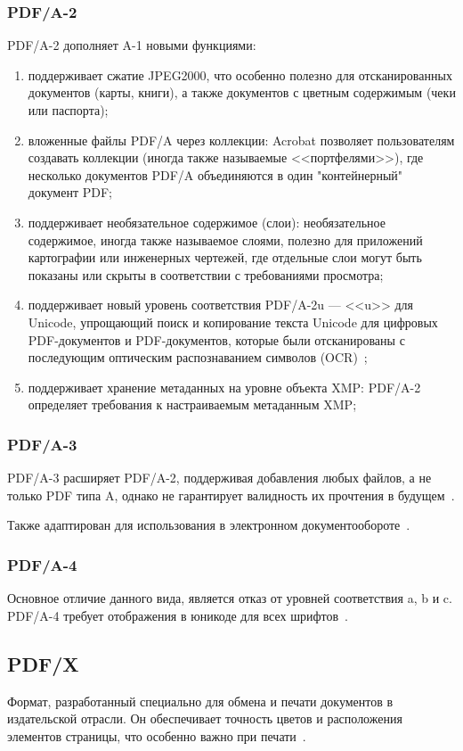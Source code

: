 \subsubsection{PDF/A-2}
PDF/A-2 дополняет A-1 новыми функциями:
\begin{enumerate}
	\item поддерживает сжатие JPEG2000, что особенно полезно для отсканированных документов (карты, книги), а также документов с цветным содержимым (чеки или паспорта);
	\item вложенные файлы PDF/A через коллекции: Acrobat позволяет пользователям создавать коллекции (иногда также называемые <<портфелями>>), где несколько документов PDF/A объединяются в один "контейнерный" документ PDF;
	
	\item поддерживает необязательное содержимое (слои): необязательное содержимое, иногда также называемое слоями, полезно для приложений картографии или инженерных чертежей, где отдельные слои могут быть показаны или скрыты в соответствии с требованиями просмотра;
	\item поддерживает новый уровень соответствия PDF/A-2u --- <<u>> для Unicode, упрощающий поиск и копирование текста Unicode для цифровых PDF-документов и PDF-документов, которые были отсканированы с последующим оптическим распознаванием символов (OCR)~\cite{pdf_a_2};
	
	\item поддерживает хранение метаданных на уровне объекта XMP: PDF/A-2 определяет требования к настраиваемым метаданным XMP;
	
\end{enumerate}
\subsubsection{PDF/A-3}
PDF/A-3 расширяет PDF/A-2, поддерживая добавления любых файлов, а не только PDF типа A, однако не гарантирует валидность их прочтения в будущем~\cite{pdf_a_2}.

Также адаптирован для использования в электронном документообороте~\cite{nalogi}.
\subsubsection{PDF/A-4}
Основное отличие данного вида, является отказ от уровней соответствия a, b и c. PDF/A-4 требует отображения в юникоде для всех шрифтов~\cite{pdf_a_4}.

\subsection{PDF/X}
Формат, разработанный специально для обмена и печати документов в издательской отрасли. Он обеспечивает точность цветов и расположения элементов страницы, что особенно важно при печати~\cite{abdobe_PDF}.


